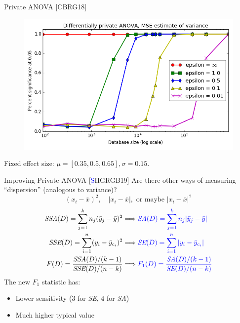 \documentclass{beamer}
\newcommand{\sse}{\textit{SSE}\xspace}
\newcommand{\ssa}{\textit{SSA}\xspace}
\newcommand{\se}{\textit{SE}\xspace}
\newcommand{\sa}{\textit{SA}\xspace}
\begin{document}
\begin{frame}{Private ANOVA [CBRG18]}
  \begin{figure}
  \includegraphics[scale=0.45]{images/campbellpower}
  \end{figure}
  \centering
 Fixed effect size: $\mu = [0.35, 0.5, 0.65], \sigma = 0.15$.
\end{frame}


\begin{frame}{Improving Private ANOVA [\textcolor{blue}{S}HGRGB19]}
\pause
Are there other ways of measuring ``dispersion'' (analogous to variance)? \pause
$$(x_i - \bar{x})^2, \quad \lvert x_i - \bar{x} \rvert, \text{ or maybe }\lvert x_i - \bar{x} \rvert^?$$  \pause
\begin{align*}
\ssa(D) = \sum_{j=1}^{k} n_j (\bar{y}_j - \bar{y})^2  &\Longrightarrow \textcolor{blue}{ \sa(D) = \sum_{j=1}^{k} n_j |\bar{y}_j - \bar{y}| }\\  
\sse(D) = \sum_{i=1}^{n}  (y_{i}-\bar{y}_{c_i})^2  &\Longrightarrow \textcolor{blue}{\se(D) = \sum_{i=1}^{n}  |y_{i}-\bar{y}_{c_i}| } \\  
F(D) = \frac{\ssa(D)/(k-1)}{\sse(D)/(n-k)} &\Longrightarrow  \textcolor{blue} {F_1(D) = \frac{\sa(D)/(k-1)}{\se(D)/(n-k)}}
\end{align*}
 \pause
The new $F_1$ statistic has: \pause
\begin{itemize}
\item Lower sensitivity (3 for \se, 4 for \sa) \pause
\item Much higher typical value 
\end{itemize}
\end{frame}
\end{document}
